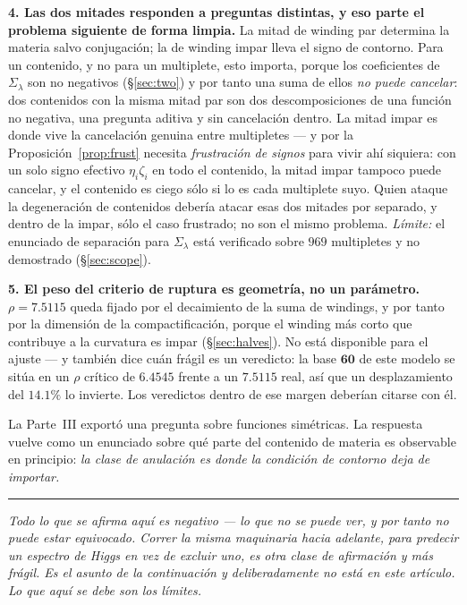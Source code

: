 \documentclass[11pt,a4paper]{article}
\newcommand{\Sig}{\Sigma_\lambda}
\newcommand{\bridge}[1]{\par\medskip\noindent
  \textcolor{hdrblue!45}{\rule{2.2cm}{0.6pt}}\;\;\parbox[t]{0.84\textwidth}{\small\itshape
  \textcolor{hdrblue!85}{#1}}\par\medskip}
\begin{document}
\textbf{4. Las dos mitades responden a preguntas distintas, y eso parte el problema siguiente de
forma limpia.} La mitad de winding par determina la materia salvo conjugación; la de winding impar
lleva el signo de contorno. Para un contenido, y no para un multiplete, esto importa, porque los
coeficientes de $\Sig$ son no negativos (\S\ref{sec:two}) y por tanto una suma de ellos \emph{no
puede cancelar}: dos contenidos con la misma mitad par son dos descomposiciones de una función no
negativa, una pregunta aditiva y sin cancelación dentro. La mitad impar es donde vive la cancelación
genuina entre multipletes --- y por la Proposición~\ref{prop:frust} necesita \emph{frustración de
signos} para vivir ahí siquiera: con un solo signo efectivo $\eta_i\zeta_i$ en todo el contenido, la
mitad impar tampoco puede cancelar, y el contenido es ciego sólo si lo es cada multiplete suyo. Quien
ataque la degeneración de contenidos debería atacar esas dos mitades por separado, y dentro de la
impar, sólo el caso frustrado; no son el mismo problema. \emph{Límite:} el enunciado de separación
para $\Sig$ está verificado sobre $969$ multipletes y no demostrado (\S\ref{sec:scope}).

\textbf{5. El peso del criterio de ruptura es geometría, no un parámetro.} $\rho=7.5115$ queda fijado
por el decaimiento de la suma de windings, y por tanto por la dimensión de la compactificación,
porque el winding más corto que contribuye a la curvatura es impar (\S\ref{sec:halves}). No está
disponible para el ajuste --- y también dice cuán frágil es un veredicto: la base $\mathbf{60}$ de
este modelo se sitúa en un $\rho$ crítico de $6.4545$ frente a un $7.5115$ real, así que un
desplazamiento del $14.1\%$ lo invierte. Los veredictos dentro de ese margen deberían citarse con él.

\medskip
La Parte~III exportó una pregunta sobre funciones simétricas. La respuesta vuelve como un enunciado
sobre qué parte del contenido de materia es observable en principio: \emph{la clase de anulación es
donde la condición de contorno deja de importar.}

\bridge{Todo lo que se afirma aquí es negativo --- lo que no se puede ver, y por tanto no puede estar
equivocado. Correr la misma maquinaria \emph{hacia adelante}, para predecir un espectro de Higgs en
vez de excluir uno, es otra clase de afirmación y más frágil. Es el asunto de la continuación y
deliberadamente no está en este artículo. Lo que aquí se debe son los límites.}

\end{document}
